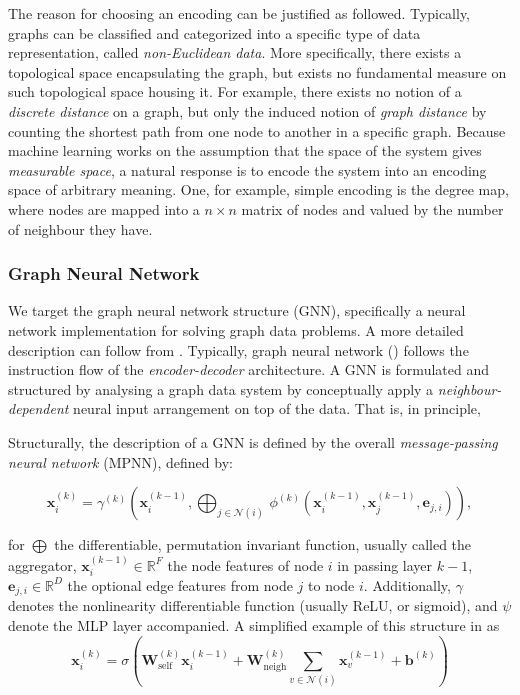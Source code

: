 The reason for choosing an encoding can be justified as followed. Typically, graphs can be classified and categorized into a specific type of data representation, called \textit{non-Euclidean data}. More specifically, there exists a topological space encapsulating the graph, but exists no fundamental measure on such topological space housing it. For example, there exists no notion of a \textit{discrete distance} on a graph, but only the induced notion of \textit{graph distance} by counting the shortest path from one node to another in a specific graph. Because machine learning works on the assumption that the space of the system gives \textit{measurable space}, a natural response is to encode the system into an encoding space of arbitrary meaning. One, for example, simple encoding is the degree map, where nodes are mapped into a $n\times n$ matrix of nodes and valued by the number of neighbour they have.  

\subsubsection{Graph Neural Network}

We target the graph neural network structure (GNN), specifically a neural network implementation for solving graph data problems. A more detailed description can follow from \cite{GRP_Hamilton,Scar04}. Typically, graph neural network (\cite{Scar04,Veli_kovi__2023,tanis2024introductiongraphneuralnetworks,lopushanskyy2024graphneuralnetworksgraph}) follows the instruction flow of the \textit{encoder-decoder} architecture. A GNN is formulated and structured by analysing a graph data system by conceptually apply a \textit{neighbour-dependent} neural input arrangement on top of the data. That is, in principle, 

Structurally, the description of a GNN is defined by the overall \textit{message-passing neural network} (MPNN), defined by: 

\begin{equation}
    \mathbf{x}_i^{(k)} = \gamma^{(k)} \left( \mathbf{x}_i^{(k-1)}, \bigoplus_{j \in \mathcal{N}(i)} \, \phi^{(k)}\left(\mathbf{x}_i^{(k-1)}, \mathbf{x}_j^{(k-1)},\mathbf{e}_{j,i}\right) \right),
\end{equation}

for $\bigoplus$ the differentiable, permutation invariant function, usually called the aggregator, $\mathbf{x}^{(k-1)}_i \in \mathbb{R}^F$ the node features of node $i$ in passing layer $k-1$, $\mathbf{e}_{j,i} \in \mathbb{R}^D$ the optional edge features from node $j$ to node $i$. Additionally, $\gamma$ denotes the nonlinearity differentiable function (usually ReLU, or sigmoid), and $\psi$ denote the MLP layer accompanied. A simplified example of this structure in \cite{Scar04,GRP_Hamilton} as 
\begin{equation}
    \mathbf{x}_i^{(k)} = \sigma \left( \mathbf{W}_{\mathrm{self}}^{(k)} \mathbf{x}_i^{(k-1)} +  \mathbf{W}_{\mathrm{neigh}}^{(k)} \sum_{v\in \mathcal{N}(i)} \mathbf{x}_v^{(k-1)} + \mathbf{b}^{(k)} \right)
\end{equation}

